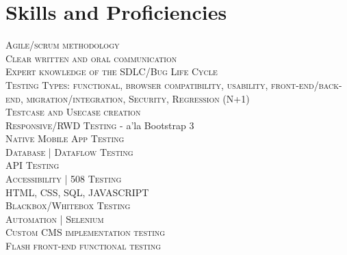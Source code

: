 \documentclass[a4paper,10pt]{article}
\begin{document}
\section{Skills and Proficiencies}
\begin{flushleft}
\textsc{Agile/scrum methodology}\\ \textsc{Clear written and oral communication}\\ \textsc{Expert knowledge of the SDLC/Bug Life Cycle}\\ \textsc{Testing Types: functional, browser compatibility, usability, front-end/back-end, migration/integration, Security, Regression (N+1)}\\ \textsc{Testcase and Usecase creation}\\ \textsc{Responsive/RWD Testing} - a'la {Bootstrap 3}\\ \textsc{Native Mobile App Testing}\\ \textsc{Database | Dataflow Testing}\\ \textsc{API Testing}\\ \textsc{Accessibility | 508 Testing}\\  \textsc{HTML, CSS, SQL, JAVASCRIPT}\\\textsc{Blackbox/Whitebox Testing}\\ \textsc{Automation | Selenium}\\ \textsc{Custom CMS implementation testing}\\ \textsc{Flash front-end functional testing}\\
\end{flushleft}


\vspace{100 mm}
\begin{center}
\end{center}
\end{document}
